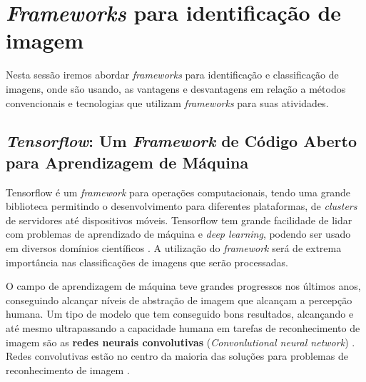 
\section{\textit{Frameworks} para identificação de imagem}

Nesta sessão iremos abordar \textit{frameworks} para identificação e classificação de imagens, onde são usando, as vantagens e desvantagens em  relação a métodos convencionais e tecnologias que utilizam \textit{frameworks} para suas atividades. %


\subsection{\textit{Tensorflow}: Um \textit{Framework} de Código Aberto para Aprendizagem de Máquina}

Tensorflow é um \textit{framework} para operações computacionais, tendo uma grande biblioteca permitindo o desenvolvimento para diferentes plataformas, de \textit{clusters} de servidores até dispositivos móveis. Tensorflow tem grande facilidade de lidar com problemas de aprendizado de máquina e \textit{deep learning}, podendo ser usado em diversos domínios científicos \cite{tensorflow2015}. A utilização do \textit{framework} será de extrema importância nas classificações de imagens que serão processadas.

O campo de aprendizagem de máquina teve grandes progressos nos últimos anos, conseguindo alcançar níveis de abstração de imagem que alcançam a percepção humana. Um tipo de modelo que tem conseguido bons resultados, alcançando e até mesmo ultrapassando a capacidade humana em tarefas de reconhecimento de imagem são as \textbf{redes neurais convolutivas} (\textit{Convonlutional neural network}) \cite{Tensorflow2018}. Redes convolutivas estão no centro da maioria das soluções para problemas de reconhecimento de imagem \cite{SzegedyVISW15}.

